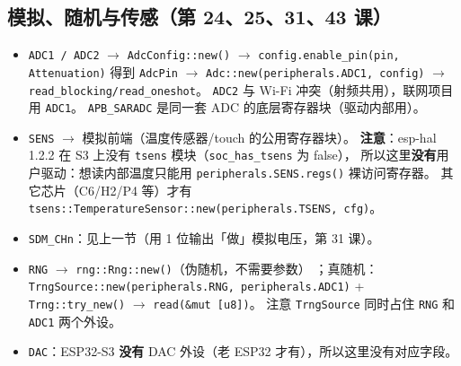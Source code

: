 \documentclass[UTF8,a4paper,11pt,fontset=fandol]{ctexart}
\newcommand{\fld}[1]{\texttt{#1}}
\begin{document}
\subsection{模拟、随机与传感（第 24、25、31、43 课）}
\begin{itemize}
  \item \fld{ADC1 / ADC2} $\rightarrow$ \fld{AdcConfig::new()} $\rightarrow$
    \fld{config.enable\_pin(pin, Attenuation)} 得到 \fld{AdcPin}
    $\rightarrow$ \fld{Adc::new(peripherals.ADC1, config)} $\rightarrow$ \fld{read\_blocking/read\_oneshot}。
    \fld{ADC2} 与 Wi-Fi 冲突（射频共用），联网项目用 \fld{ADC1}。
    \fld{APB\_SARADC} 是同一套 ADC 的底层寄存器块（驱动内部用）。
  \item \fld{SENS} $\rightarrow$ 模拟前端（温度传感器/touch 的公用寄存器块）。
    \textbf{注意}：esp-hal 1.2.2 在 S3 上没有 \fld{tsens} 模块（\fld{soc\_has\_tsens} 为 false），
    所以这里\textbf{没有}用户驱动：想读内部温度只能用 \fld{peripherals.SENS.regs()} 裸访问寄存器。
    其它芯片（C6/H2/P4 等）才有 \fld{tsens::TemperatureSensor::new(peripherals.TSENS, cfg)}。
  \item \fld{SDM\_CHn}：见上一节（用 1 位输出「做」模拟电压，第 31 课）。
  \item \fld{RNG} $\rightarrow$ \fld{rng::Rng::new()}（伪随机，不需要参数）
    ；真随机：\fld{TrngSource::new(peripherals.RNG, peripherals.ADC1)} +
    \fld{Trng::try\_new()} $\rightarrow$ \fld{read(\&mut [u8])}。
    注意 \fld{TrngSource} 同时占住 \fld{RNG} 和 \fld{ADC1} 两个外设。
  \item \fld{DAC}：ESP32-S3 \textbf{没有} DAC 外设（老 ESP32 才有），所以这里没有对应字段。
\end{itemize}
\end{document}
